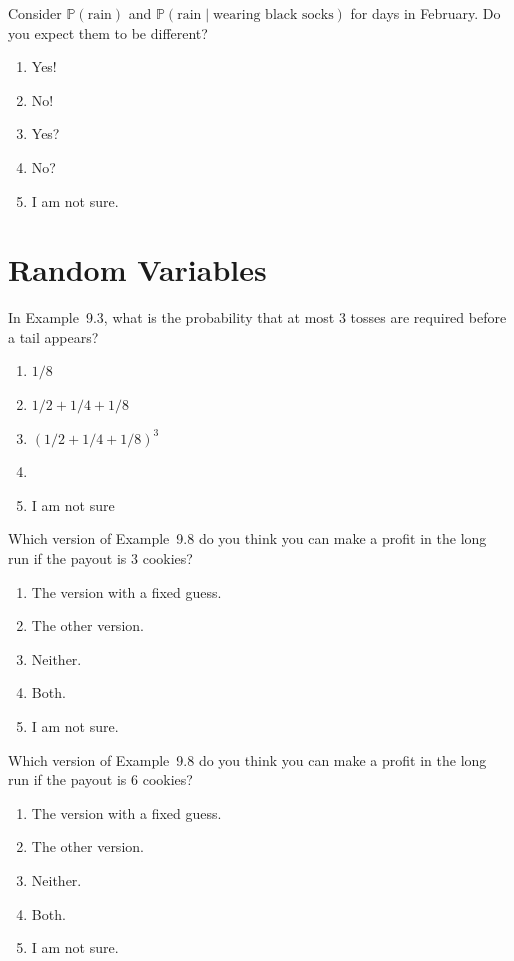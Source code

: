 \documentclass[aspectratio=169, t, 14pt]{beamer}
\begin{document}
\begin{poll}
  Consider \(\mathbb{P}(\text{rain})\) and \(\mathbb{P}(\text{rain} \mid \text{wearing black socks})\) for days in February. Do you expect them to be different?

  \begin{enumerate}
    \item Yes!
    \item No!
    \item Yes?
    \item No?
    \item I am not sure.
  \end{enumerate}
\end{poll}

\section{Random Variables}
\begin{frame}[c]
  In Example~9.3, what is the probability that at most 3 tosses are required before a tail appears?
  \begin{enumerate}
    \item \(1/8\)
    \item \(1/2 + 1/4 + 1/8\)
    \item \((1/2 + 1/4 + 1/8)^{3}\)
    \item 
    \item I am not sure
  \end{enumerate}
\end{frame}

\begin{poll}
  Which version of Example~9.8 do you think you can make a profit in the long run if the payout is \(3\) cookies?

  \begin{enumerate}
    \item The version with a fixed guess.
    \item The other version.
    \item Neither.
    \item Both.
    \item I am not sure.
  \end{enumerate}
\end{poll}

\begin{poll}
  Which version of Example~9.8 do you think you can make a profit in the long run if the payout is \(6\) cookies?

  \begin{enumerate}
    \item The version with a fixed guess.
    \item The other version.
    \item Neither.
    \item Both.
    \item I am not sure.
  \end{enumerate}
\end{poll}
\end{document}
